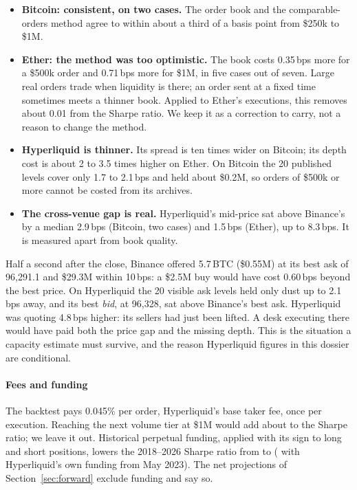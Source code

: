\documentclass[11pt,a4paper]{article}
\newcommand{\bps}{\,bps}
\begin{document}
\begin{itemize}
\item \textbf{Bitcoin: consistent, on two cases.} The order book and the comparable-orders method agree to within about a third
  of a basis point from \$250k to \$1M.
\item \textbf{Ether: the method was too optimistic.} The book costs 0.35\bps{} more for a \$500k order and 0.71\bps{} more for \$1M, in
  five cases out of seven. Large real orders trade when liquidity is there; an order sent at a fixed time sometimes meets a thinner
  book. Applied to Ether's executions, this removes about 0.01 from the Sharpe ratio. We keep it as a correction to carry, not a
  reason to change the method.
\item \textbf{Hyperliquid is thinner.} Its spread is ten times wider on Bitcoin; its depth cost is about 2 to 3.5 times higher on
  Ether. On Bitcoin the 20 published levels cover only 1.7 to 2.1\bps{} and held about \$0.2M, so orders of \$500k or more cannot
  be costed from its archives.
\item \textbf{The cross-venue gap is real.} Hyperliquid's mid-price sat above Binance's by a median 2.9\bps{} (Bitcoin, two cases)
  and 1.5\bps{} (Ether), up to 8.3\bps. It is measured apart from book quality.
\end{itemize}

\begin{casebox}
Half a second after the close, Binance offered 5.7\,BTC (\$0.55M) at its best ask of 96{,}291.1 and \$29.3M within 10\bps: a
\$2.5M buy would have cost 0.60\bps{} beyond the best price. On Hyperliquid the 20 visible ask levels held only dust up to
2.1\bps{} away, and its best \emph{bid}, at 96{,}328, sat above Binance's best ask. Hyperliquid was quoting 4.8\bps{} higher: its
sellers had just been lifted. A desk executing there would have paid both the price gap and the missing depth. This is the
situation a capacity estimate must survive, and the reason Hyperliquid figures in this dossier are conditional.
\end{casebox}

\paragraph{Fees and funding} The backtest pays 0.045\% per order, Hyperliquid's base taker fee, once per execution. Reaching the
next volume tier at \$1M would add about \FeeGain{} to the Sharpe ratio; we leave it out. Historical
perpetual funding, applied with its sign to long and short positions, lowers the 2018--2026 Sharpe ratio from \PfSharpe{} to
\FundingSharpe{} (\FundingHlSharpe{} with Hyperliquid's own funding from May 2023). The net projections of
Section~\ref{sec:forward} exclude funding and say so.
\end{document}
